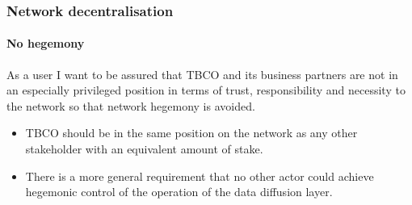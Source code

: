 \subsubsection{Network decentralisation}

\paragraph{No hegemony}

As a user I want to be assured that TBCO and its business partners are not in
an especially privileged position in terms of trust, responsibility and
necessity to the network so that network hegemony is avoided.

\begin{itemize}
\item TBCO should be in the same position on the network as any other
      stakeholder with an equivalent amount of stake.
\item There is a more general requirement that no other actor could
      achieve hegemonic control of the operation of the data diffusion layer.
\end{itemize}


